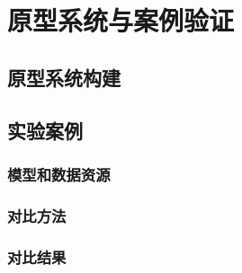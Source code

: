 \chapter{原型系统与案例验证}

\section{原型系统构建}

\section{实验案例}
\subsection{模型和数据资源}
\subsection{对比方法}
\subsection{对比结果}